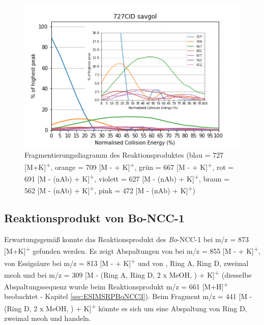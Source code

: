 \begin{figure}[!htbp]
  \centering
  \includegraphics[scale=0.7]{figures/Kapitel4/Kataboliten/diags/727CID-savgol.png}
  \caption[Fragmentierungsdiagramm des Reaktionsproduktes von \textit{Bo}-DNCC, Quelle: Autor]{Fragmentierungsdiagramm des Reaktionsproduktes (blau = 727 [M+K]\textsuperscript{+}, orange = 709 [M -  + K]\textsuperscript{+}, grün = 667 [M -  + K]\textsuperscript{+}, rot = 691 [M - (\gls{nAb}) + K]\textsuperscript{+}, violett = 627 [M - (\gls{nAb}) + K]\textsuperscript{+}, braun = 562 [M - (\gls{nAb}) + K]\textsuperscript{+}, pink = 472 [M - (\gls{nAb}) + K]\textsuperscript{+})}
  \label{fig:727MKLeafspraydiags}
\end{figure}



\subsection{Reaktionsprodukt von Bo-NCC-1}

Erwartungsgemäß konnte das Reaktionsprodukt des \textit{Bo}-NCC-1 bei m/z = 873 [M+K]\textsuperscript{+} gefunden werden. Es zeigt Abspaltungen von  bei m/z = 855 [M -  + K]\textsuperscript{+}, von Essigsäure bei m/z = 813 [M -  + K]\textsuperscript{+} und von , Ring A, Ring D, zweimal \gls{meoh} und  bei m/z = 309 [M - (Ring A, Ring D, 2 x MeOH, )  + K]\textsuperscript{+} (diesselbe Abspaltungssequenz wurde beim Reaktionsprodukt m/z = 661 [M+H]\textsuperscript{+} beobachtet - Kapitel \ref{sec:ESIMSRPBoNCC3}). Beim Fragment m/z = 441 [M - (Ring D, 2 x MeOH, ) + K]\textsuperscript{+} könnte es sich um eine Abspaltung von Ring D, zweimal \gls{meoh} und  handeln. 

